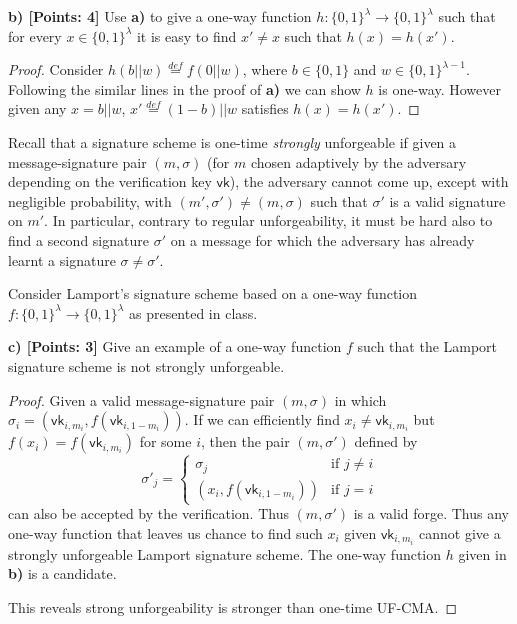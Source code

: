 \documentclass[12pt]{article}
\newcommand{\eqdef}{\stackrel{def}{=}}
\newcommand{\bits}{\{0,1\}}
\theoremstyle{definition}
\begin{document}
{\bf b) [Points: 4]} Use {\bf a)} to give a one-way function $h : \bits^\lambda \to \bits^\lambda$ such that for every $x\in\bits^\lambda$ it is easy to find $x'\not = x$ such that $h(x)=h(x')$.
\begin{proof}
Consider $h(b||w) \eqdef f(0||w)$, where $b\in\bits$ and $w\in\bits^{\lambda-1}$.
Following the similar lines in the proof of {\bf a)} we can show $h$ is one-way. However given any $x=b||w$, $x'\eqdef (1-b)||w$ satisfies $h(x)=h(x')$.
\end{proof}

\newcommand{\vk}{\mathsf{vk}}
Recall that a signature scheme is one-time \emph{strongly} unforgeable if given a message-signature
pair $(m,\sigma)$ (for $m$ chosen adaptively by the adversary depending on the verification key $\vk$), the adversary cannot come up, except with negligible probability, with $(m',\sigma') \not= (m,\sigma)$ such that $\sigma'$ is a valid signature on $m'$. In particular, contrary to regular unforgeability, it must be hard also to find a second signature $\sigma'$ on a message for which the
adversary has already learnt a signature $\sigma \not= \sigma'$.

Consider Lamport's signature scheme based on a one-way function $f : \bits^\lambda \to \bits^\lambda$ as presented in class.

{\bf c) [Points: 3]} Give an example of a one-way function $f$ such that the Lamport signature scheme is not strongly unforgeable.
\begin{proof}
Given a valid message-signature pair $(m,\sigma)$ in which $\sigma_i = (\vk_{i,m_i}, f(\vk_{i,1-m_i}))$. If we can efficiently find $x_i \not= \vk_{i,m_i}$ but $f(x_i) = f(\vk_{i,m_i})$ for some $i$, then the pair $(m,\sigma')$ defined by
$$\sigma'_j = \begin{cases}
\sigma_j & \textrm{if $j\not=i$} \\
(x_i, f(\vk_{i,1-m_i})) & \textrm{if $j=i$}
\end{cases}$$
can also be accepted by the verification. Thus $(m,\sigma')$ is a valid forge. 
Thus any one-way function that leaves us chance to find such $x_i$ given $\vk_{i,m_i}$ cannot give a strongly unforgeable Lamport signature scheme. The one-way function $h$ given in {\bf b)} is a candidate.

This reveals strong unforgeability is stronger than one-time UF-CMA.
\end{proof} 
\end{document}
